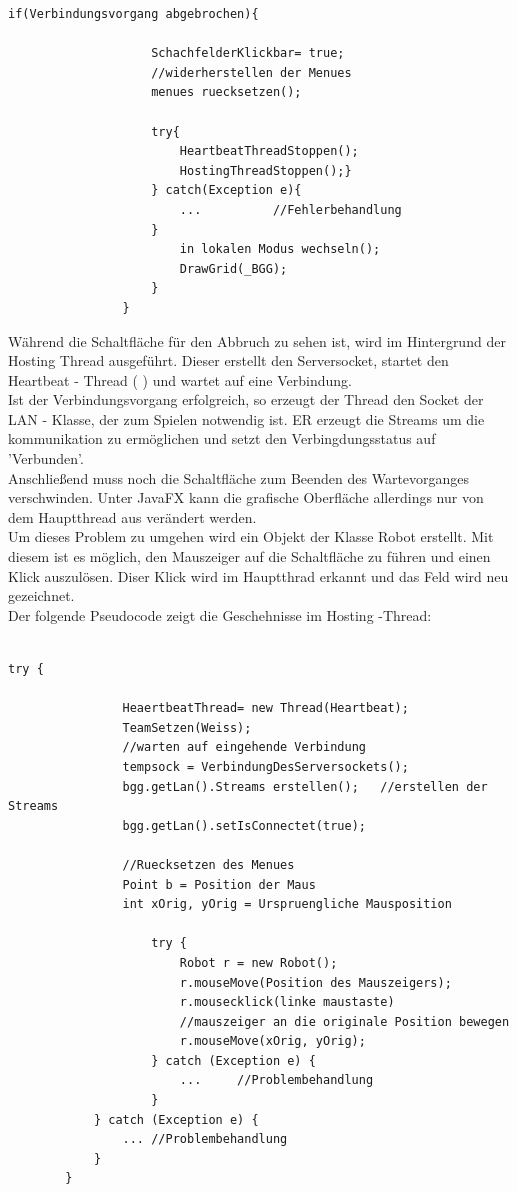\documentclass[12pt,a4paper]{article}
\begin{document}
{\begin{lstlisting}
if(Verbindungsvorgang abgebrochen){

					SchachfelderKlickbar= true; 
					//widerherstellen der Menues
					menues ruecksetzen();		
						
					try{	
						HeartbeatThreadStoppen();
						HostingThreadStoppen();}
					} catch(Exception e){
						...			 //Fehlerbehandlung
					}
						in lokalen Modus wechseln();
						DrawGrid(_BGG);
					}
				}

\end{lstlisting}

Während die Schaltfläche für den Abbruch zu sehen ist, wird im Hintergrund der Hosting Thread ausgeführt. Dieser erstellt den Serversocket, startet den Heartbeat - Thread ( %
) und wartet auf eine Verbindung. \\[2ex]
Ist der Verbindungsvorgang erfolgreich, so erzeugt der Thread den Socket der LAN - Klasse, der zum Spielen notwendig ist. ER erzeugt die Streams um die kommunikation zu ermöglichen und setzt den Verbingdungsstatus auf 'Verbunden'. \\
Anschließend muss noch die Schaltfläche zum Beenden des Wartevorganges verschwinden. Unter JavaFX kann die grafische Oberfläche allerdings nur von dem Hauptthread aus verändert werden.\\ Um dieses Problem zu umgehen wird ein Objekt der Klasse Robot erstellt. Mit diesem ist es möglich, den Mauszeiger auf die Schaltfläche zu führen und einen Klick auszulösen. 
Diser Klick wird im Hauptthrad erkannt und das Feld wird neu gezeichnet. \\
Der folgende Pseudocode zeigt die Geschehnisse im Hosting -Thread:\\
\lstset{language=java}
\begin{lstlisting}

try {
				
				HeaertbeatThread= new Thread(Heartbeat);
				TeamSetzen(Weiss);
				//warten auf eingehende Verbindung
				tempsock = VerbindungDesServersockets();
				bgg.getLan().Streams erstellen();	//erstellen der Streams
				bgg.getLan().setIsConnectet(true);
				
				//Ruecksetzen des Menues
				Point b = Position der Maus
				int xOrig, yOrig = Urspruengliche Mausposition
		      
		            try {
		                Robot r = new Robot();
		                r.mouseMove(Position des Mauszeigers);
		                r.mousecklick(linke maustaste)
		                //mauszeiger an die originale Position bewegen
		                r.mouseMove(xOrig, yOrig);
		            } catch (Exception e) {
		                ...  	//Problembehandlung
		            }
			} catch (Exception e) {
				...	//Problembehandlung
			}		
		}


\end{lstlisting}}
\end{document}
